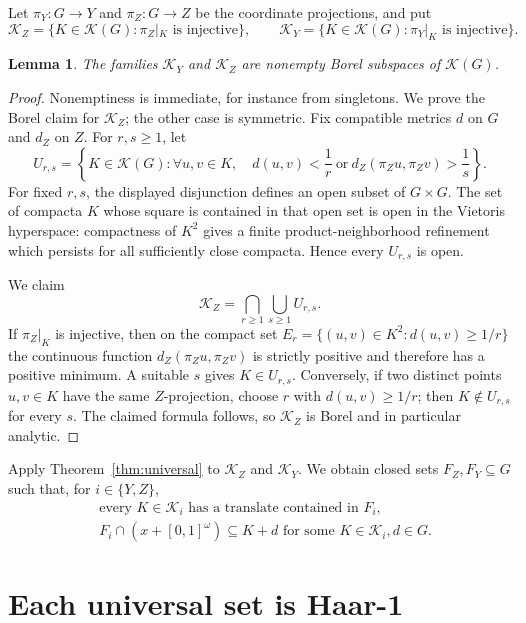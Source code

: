 \documentclass[11pt]{article}
\newtheorem{lemma}{Lemma}
\newcommand{\K}{\mathcal K}
\newcommand{\cK}{\mathscr K}
\begin{document}
Let $\pi_Y:G\to Y$ and $\pi_Z:G\to Z$ be the coordinate projections, and put
\[
 \cK_Z=\{K\in\K(G):\pi_Z|_K\text{ is injective}\},\qquad
 \cK_Y=\{K\in\K(G):\pi_Y|_K\text{ is injective}\}.
\]

\begin{lemma}\label{lem:borel}
The families $\cK_Y$ and $\cK_Z$ are nonempty Borel subspaces of $\K(G)$.
\end{lemma}

\begin{proof}
Nonemptiness is immediate, for instance from singletons.  We prove the Borel
claim for $\cK_Z$; the other case is symmetric.  Fix compatible metrics $d$
on $G$ and $d_Z$ on $Z$.  For $r,s\geq1$, let
\[
 U_{r,s}=\left\{K\in\K(G):
   \forall u,v\in K,\quad d(u,v)<\frac1r\ \text{or}\
   d_Z(\pi_Zu,\pi_Zv)>\frac1s\right\}.
\]
For fixed $r,s$, the displayed disjunction defines an open subset of
$G\times G$.  The set of compacta $K$ whose square is contained in that open
set is open in the Vietoris hyperspace: compactness of $K^2$ gives a finite
product-neighborhood refinement which persists for all sufficiently close
compacta.  Hence every $U_{r,s}$ is open.

We claim
\[
             \cK_Z=\bigcap_{r\geq1}\bigcup_{s\geq1}U_{r,s}.
\]
If $\pi_Z|_K$ is injective, then on the compact set
\(
E_r=\{(u,v)\in K^2:d(u,v)\geq 1/r\}
\)
the continuous function
$d_Z(\pi_Zu,\pi_Zv)$ is strictly positive and therefore has a positive
minimum.  A suitable $s$ gives $K\in U_{r,s}$.  Conversely, if two distinct
points $u,v\in K$ have the same $Z$-projection, choose $r$ with
$d(u,v)\geq1/r$; then $K\notin U_{r,s}$ for every $s$.  The claimed formula
follows, so $\cK_Z$ is Borel and in particular analytic.
\end{proof}

Apply Theorem~\ref{thm:universal} to $\cK_Z$ and $\cK_Y$.  We obtain closed
sets $F_Z,F_Y\subseteq G$ such that, for $i\in\{Y,Z\}$,
\begin{align}
&\text{every }K\in\cK_i\text{ has a translate contained in }F_i,
\label{eq:absorb}\\
&F_i\cap(x+[0,1]^\omega)\subseteq K+d
  \text{ for some }K\in\cK_i,d\in G.                 \label{eq:local}
\end{align}

\section{Each universal set is Haar-1}
\end{document}
